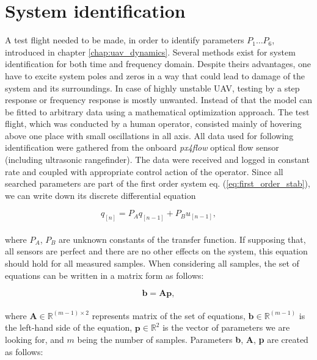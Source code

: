\section{System identification}
\label{cap:system_identification}

A test flight needed to be made, in order to identify parameters $P_1 \hdots P_6$, introduced in chapter \ref{chap:uav_dynamics}. Several methods exist for system identification for both time and frequency domain. Despite theirs advantages, one have to excite system poles and zeros in a way that could lead to damage of the system and its surroundings. In case of highly unstable UAV, testing by a step response or frequency response is mostly unwanted. Instead of that the model can be fitted to arbitrary data using a mathematical optimization approach. The test flight, which was conducted by a human operator, consisted mainly of hovering above one place with small oscillations in all axis. All data used for following identification were gathered from the onboard \emph{px4flow} optical flow sensor (including ultrasonic rangefinder). The data were received and logged in constant rate and coupled with appropriate control action of the operator. Since all searched parameters are part of the first order system eq. (\ref{eq:first_order_stab}), we can write down its discrete differential equation

\begin{equation}
q_{[n]} = P_Aq_{[n-1]} + P_Bu_{[n-1]},
\end{equation}
\\
where $P_A$, $P_B$ are unknown constants of the transfer function. If supposing that, all sensors are perfect and there are no other effects on the system, this equation should hold for all measured samples. When considering all samples, the set of equations can be written in a matrix form as follows:

\begin{equation}
\textbf{b} = \textbf{A}\textbf{p},
\label{eq:bap}
\end{equation}
\\
where $\textbf{A} \in \mathbb{R}^{(m-1)\times2}$ represents matrix of the set of equations, $\textbf{b} \in \mathbb{R}^{(m-1)}$ is the left-hand side of the equation, $\textbf{p} \in \mathbb{R}^{2}$ is the vector of parameters we are looking for, and $m$ being the number of samples. Parameters \textbf{b}, \textbf{A}, \textbf{p} are created as follows:

